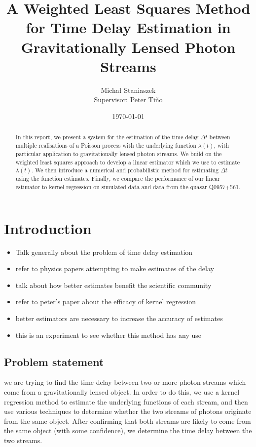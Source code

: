 \documentclass[a4paper,12pt]{article}
\title{A Weighted Least Squares Method for Time Delay Estimation in Gravitationally Lensed Photon Streams}
\author{\Large{Micha{\l} Staniaszek} \\\small{Supervisor: Peter Tiňo}}
\date{\today}
\begin{document}
\maketitle


\thispagestyle{empty}
\newpage
{}
\begin{abstract}
In this report, we present a system for the estimation of the
time delay $\Delta t$ between multiple realisations of a Poisson
process with the underlying function $\lambda(t)$, with particular
application to gravitationally lensed photon streams. We build on
the weighted least squares approach to develop a linear estimator 
which we use to estimate $\lambda(t)$. We then introduce a numerical
and probabilistic method for estimating $\Delta t$ using
the function estimates. Finally, we compare the performance of our
linear estimator to kernel regression on simulated data and data 
from the quasar Q0957+561.
\end{abstract}
\newpage
\tableofcontents
\newpage
{}
\section{Introduction}
\label{sec-1}

\begin{itemize}
\item Talk generally about the problem of time delay estimation
\item refer to physics papers attempting to make estimates of the delay
\item talk about how better estimates benefit the scientific community
\item refer to peter's paper about the efficacy of kernel regression
\item better estimators are necessary to increase the accuracy of estimates
\item this is an experiment to see whether this method has any use
\end{itemize}
\subsection{Problem statement}
\label{sec-1-1}

   we are trying to find the time delay between two or more photon
   streams which come from a gravitationally lensed object. In order
   to do this, we use a kernel regression method to estimate the
   underlying functions of each stream, and then use various
   techniques to determine whether the two streams of photons
   originate from the same object. After confirming that both streams
   are likely to come from the same object (with some confidence), we
   determine the time delay between the two streams.
\end{document}
